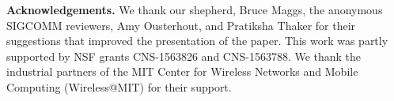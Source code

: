 
\medskip
\noindent
\textbf{Acknowledgements.} We thank our shepherd, Bruce Maggs, the anonymous SIGCOMM reviewers, Amy
Ousterhout, and Pratiksha Thaker for their suggestions
that improved the presentation of the paper. This work was partly supported by
NSF grants CNS-1563826 and CNS-1563788. We thank the industrial partners of the
MIT Center for Wireless Networks and Mobile Computing (Wireless@MIT) for their
support.

